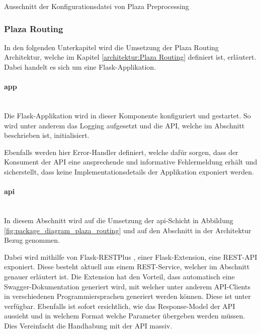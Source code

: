 \begin{listing}[ht]
    \inputminted{YAML}{projectdoc/listing/preprocess_config.yml}
    \caption{Ausschnitt der Konfigurationsdatei von Plaza Preprocessing}
    \label{listing:preprocess_config}
\end{listing}


\subsubsection{Plaza Routing}
\label{impl:Plaza Routing}
In den folgenden Unterkapitel wird die Umsetzung der Plaza Routing Architektur, welche im Kapitel \ref{architektur:Plaza Routing} definiert ist, erläutert. Dabei handelt es sich um eine Flask-Applikation\cite{flask}.

\paragraph{app}\label{impl:app-layer}~\\
Die Flask-Applikation\cite{flask} wird in dieser Komponente konfiguriert und gestartet. So wird unter anderem das Logging aufgesetzt und die \ac{API}, welche im Abschnitt  beschrieben ist, initialisiert.

Ebenfalls werden hier Error-Handler definiert, welche dafür sorgen, dass der Konsument der \ac{API} eine ansprechende und informative Fehlermeldung erhält und sicherstellt, dass keine Implementationsdetails der Applikation exponiert werden.

\paragraph{api}\label{impl:Plaza Routing api}~\\
In diesem Abschnitt wird auf die Umsetzung der api-Schicht in Abbildung \ref{fig:package_diagram_plaza_routing} und auf den Abschnitt  in der Architektur Bezug genommen.

Dabei wird mithilfe von Flask-RESTPlus \cite{flask-restplus}, einer Flask-Extension, eine \ac{REST}-\ac{API} exponiert. Diese besteht aktuell aus einem \ac{REST}-Service, welcher im Abschnitt  genauer erläutert ist. Die Extension hat den Vorteil, dass automatisch eine Swagger-Dokumentation \cite{swagger} generiert wird, mit welcher unter anderem \ac{API}-Clients in verschiedenen Programmiersprachen generiert werden können. Diese ist unter \cite{plaza-routing-api-swaggerui} verfügbar. Ebenfalls ist sofort ersichtlich, wie das Response-Model der \ac{API} aussieht und in welchem Format welche Parameter übergeben werden müssen. Dies Vereinfacht die Handhabung mit der \ac{API} massiv.

